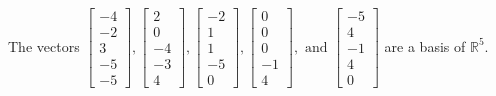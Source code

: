\begin{exercise}
\begin{exerciseStatement}
  \end{exerciseStatement}
  \begin{exerciseAnswer}
   The vectors \(\left[\begin{array}{r}
-4 \\
-2 \\
3 \\
-5 \\
-5
\end{array}\right] , \left[\begin{array}{r}
2 \\
0 \\
-4 \\
-3 \\
4
\end{array}\right] , \left[\begin{array}{r}
-2 \\
1 \\
1 \\
-5 \\
0
\end{array}\right] , \left[\begin{array}{r}
0 \\
0 \\
0 \\
-1 \\
4
\end{array}\right] , \text{ and } \left[\begin{array}{r}
-5 \\
4 \\
-1 \\
4 \\
0
\end{array}\right]\) 
  	 are  a basis of \(\mathbb{R}^5\).
  


  \end{exerciseAnswer}
\end{exercise}